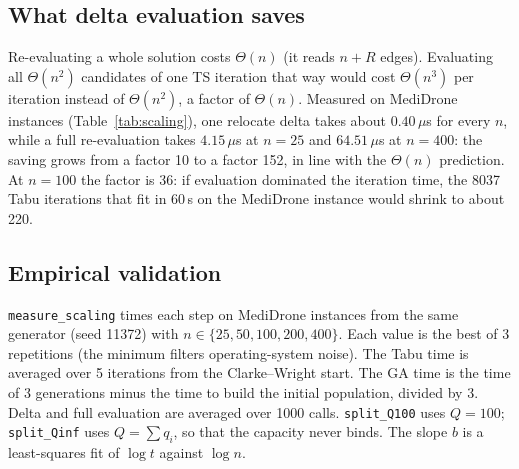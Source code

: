 \documentclass[11pt,a4paper]{article}
\theoremstyle{definition}
\theoremstyle{remark}
\newcommand{\code}[1]{\texttt{#1}}
\begin{document}
\subsection{What delta evaluation saves}
Re-evaluating a whole solution costs $\Theta(n)$ (it reads $n+R$ edges). Evaluating all
$\Theta(n^2)$ candidates of one TS iteration that way would cost $\Theta(n^3)$ per
iteration instead of $\Theta(n^2)$, a factor of $\Theta(n)$. Measured on MediDrone instances
(Table~\ref{tab:scaling}), one relocate delta takes about $0.40\,\mu$s for every $n$, while a
full re-evaluation takes $4.15\,\mu$s at $n=25$ and $64.51\,\mu$s at $n=400$: the saving
grows from a factor 10 to a factor 152, in line with the $\Theta(n)$ prediction. At $n=100$
the factor is 36: if evaluation dominated the iteration time, the 8037 Tabu iterations
that fit in 60\,s on the MediDrone instance would shrink to about 220.

\subsection{Empirical validation}
\code{measure\_scaling} times each step on MediDrone instances from the same generator
(seed 11372) with $n\in\{25,50,100,200,400\}$. Each value is the best of 3 repetitions
(the minimum filters operating-system noise). The Tabu time is averaged over 5 iterations
from the Clarke--Wright start. The GA time is the time of 3 generations minus the time to
build the initial population, divided by 3. Delta and full evaluation are averaged over
1000 calls. \code{split\_Q100} uses $Q=100$; \code{split\_Qinf} uses $Q=\sum q_i$, so that the
capacity never binds. The slope $b$ is a least-squares fit of $\log t$ against $\log n$.
\end{document}
